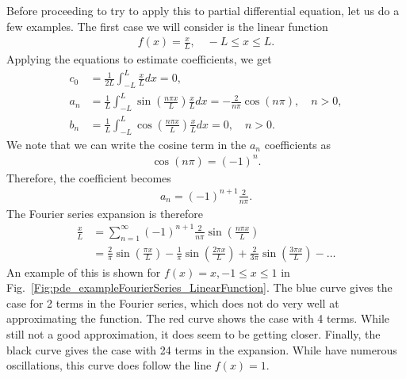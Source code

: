 Before proceeding to try to apply this to partial differential equation, let us do a few examples. The first case we will consider is the linear function
\begin{align}
  f(x) = \frac{x}{L} , \quad -L \le x \le L .
\end{align}
Applying the equations to estimate coefficients, we get
\begin{subequations}
\begin{align}
  c_0 &= \frac{1}{2L} \int_{-L}^L \frac{x}{L} dx = 0 , \\
  a_n &= \frac{1}{L} \int_{-L}^L \sin \left( \frac{n \pi x }{ L } \right) \frac{x}{L} dx = - \frac{2}{n\pi} \cos( n \pi ) , \quad n > 0, \\
  b_n &= \frac{1}{L} \int_{-L}^L \cos \left( \frac{n \pi x }{ L } \right) \frac{x}{L} dx = 0, \quad n > 0.
\end{align}
\end{subequations}
We note that we can write the cosine term in the $a_n$ coefficients as
\begin{align}
  \cos( n \pi ) = (-1)^n . \nonumber
\end{align}
Therefore, the coefficient becomes
\begin{align}
  a_n = (-1)^{n+1} \frac{2}{n\pi} .
\end{align}
The Fourier series expansion is therefore
\begin{align}
  \frac{x}{L} &= \sum_{n=1}^\infty (-1)^{n+1} \frac{2}{n\pi} \sin \left( \frac{n \pi x }{ L } \right) \\
  &= \frac{2}{\pi} \sin \left( \frac{\pi x }{ L } \right) - \frac{1}{\pi} \sin \left( \frac{2 \pi x }{ L } \right) + \frac{2}{3\pi} \sin \left( \frac{3\pi x }{ L } \right) - \ldots \nonumber
\end{align}
An example of this is shown for $f(x) = x, -1 \le x \le 1$ in Fig.~\ref{Fig:pde_exampleFourierSeries_LinearFunction}. The blue curve gives the case for 2 terms in the Fourier series, which does not do very well at approximating the function. The red curve shows the case with 4 terms. While still not a good approximation, it does seem to be getting closer. Finally, the black curve gives the case with 24 terms in the expansion. While have numerous oscillations, this curve does follow the line $f(x) = 1$.

